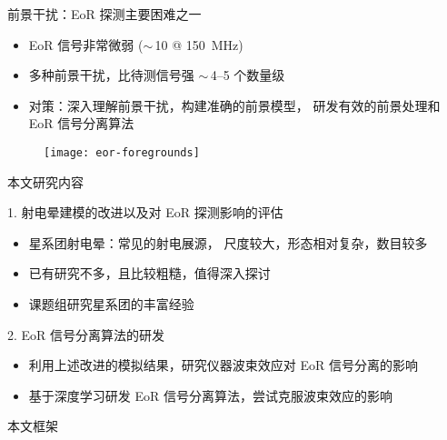 \documentclass{beamer}
\begin{document}
\begin{frame}{前景干扰：EoR 探测主要困难之一}
  \begin{itemize}
    \item EoR 信号非常微弱 ($\sim$\,\SI{10}{\mK} @ \SI{150}{\MHz})
    \item \alert{多种前景干扰}，比待测信号强 $\sim$\,4--5 个数量级
    \item \alert{对策}：深入理解前景干扰，构建准确的前景模型，
      研发有效的前景处理和 EoR 信号分离算法
  \end{itemize}

  \vspace{-1ex}
  \begin{figure}
    \centering
    \texttt{[image: eor-foregrounds]}
  \end{figure}

\end{frame}

\begin{frame}{本文研究内容}
  \begin{alertblock}{1. 射电晕建模的改进以及对 EoR 探测影响的评估}
    \begin{itemize}
      \item 星系团射电晕：常见的射电展源，
        尺度较大，形态相对复杂，数目较多
      \item 已有研究不多，且比较粗糙，值得深入探讨
      \item 课题组研究星系团的丰富经验
    \end{itemize}
  \end{alertblock}

  \begin{alertblock}{2. EoR 信号分离算法的研发}
    \begin{itemize}
      \item 利用上述改进的模拟结果，研究仪器波束效应对 EoR 信号分离的影响
      \item 基于深度学习研发 EoR 信号分离算法，尝试克服波束效应的影响
    \end{itemize}
  \end{alertblock}
\end{frame}

\begin{frame}{本文框架}
  \begin{figure}
  \end{figure}
\end{frame}
\end{document}

